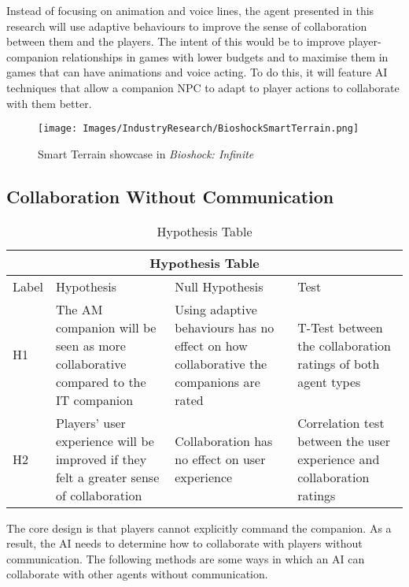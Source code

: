 \documentclass{IEEEtran}
\begin{document}
Instead of focusing on animation and voice lines, the agent presented in this research will use adaptive behaviours to improve the sense of collaboration between them and the players. The intent of this would be to improve player-companion relationships in games with lower budgets and to maximise them in games that can have animations and voice acting. To do this, it will feature AI techniques that allow a companion NPC to adapt to player actions to collaborate with them better.

\begin{figure}
  \centering
  \texttt{[image: Images/IndustryResearch/BioshockSmartTerrain.png]}
  
\caption{Smart Terrain showcase in \textit{Bioshock: Infinite}}
\label{fig:BioshockSmartTerrain}
\end{figure}

\subsection{Collaboration Without Communication}
\label{Communication}

\begin{table*}[ht]\centering
\begin{tabular}{ |p{0.5cm}|p{6cm}|p{6cm}|p{5cm}|  }
 \hline
 \multicolumn{4}{|c|}{Hypothesis Table} \\
 \hline
 Label & Hypothesis & Null Hypothesis & Test\\
 \hline
    H1 & The AM companion will be seen as more collaborative compared to the IT companion & 
    Using adaptive behaviours has no effect on how collaborative the companions are rated &
    T-Test between the collaboration ratings of both agent types \\
 \hline
    H2 & Players' user experience will be improved if they felt a greater sense of collaboration & 
    Collaboration has no effect on user experience &
    Correlation test between the user experience and collaboration ratings\\
 \hline
\end{tabular}
\caption{Hypothesis Table}
\label{HTable}
\end{table*}

The core design is that players cannot explicitly command the companion. As a result, the AI needs to determine how to collaborate with players without communication. The following methods are some ways in which an AI can collaborate with other agents without communication.
\end{document}
